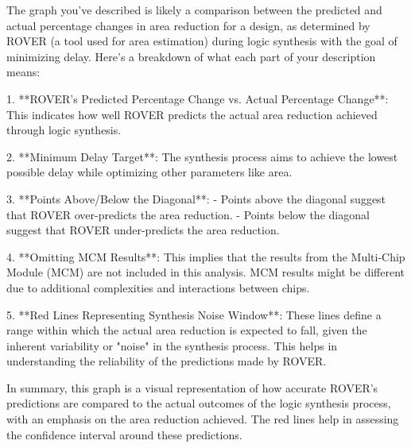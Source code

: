 The graph you've described is likely a comparison between the predicted and actual percentage changes in area reduction for a design, as determined by ROVER (a tool used for area estimation) during logic synthesis with the goal of minimizing delay. Here’s a breakdown of what each part of your description means:

1. **ROVER's Predicted Percentage Change vs. Actual Percentage Change**: This indicates how well ROVER predicts the actual area reduction achieved through logic synthesis.

2. **Minimum Delay Target**: The synthesis process aims to achieve the lowest possible delay while optimizing other parameters like area.

3. **Points Above/Below the Diagonal**: 
   - Points above the diagonal suggest that ROVER over-predicts the area reduction.
   - Points below the diagonal suggest that ROVER under-predicts the area reduction.

4. **Omitting MCM Results**: This implies that the results from the Multi-Chip Module (MCM) are not included in this analysis. MCM results might be different due to additional complexities and interactions between chips.

5. **Red Lines Representing Synthesis Noise Window**: These lines define a range within which the actual area reduction is expected to fall, given the inherent variability or "noise" in the synthesis process. This helps in understanding the reliability of the predictions made by ROVER.

In summary, this graph is a visual representation of how accurate ROVER's predictions are compared to the actual outcomes of the logic synthesis process, with an emphasis on the area reduction achieved. The red lines help in assessing the confidence interval around these predictions.